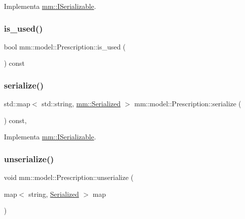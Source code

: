 Implementa \hyperlink{classmm_1_1_i_serializable_a9717e6da47fcbac3ffa2e68152464e0a}{mm\+::\+I\+Serializable}.

\mbox{\label{classmm_1_1model_1_1_prescription_a23ae0807248a2cd86232b11927c9eea2}} 
\subsubsection{\texorpdfstring{is\+\_\+used()}{is\_used()}}
{\footnotesize\ttfamily bool mm\+::model\+::\+Prescription\+::is\+\_\+used (\begin{DoxyParamCaption}{ }\end{DoxyParamCaption}) const}

\mbox{\label{classmm_1_1model_1_1_prescription_a592ff88dfa9625a383a7b073a64863b1}} 
\subsubsection{\texorpdfstring{serialize()}{serialize()}}
{\footnotesize\ttfamily std\+::map$<$ std\+::string, \hyperlink{structmm_1_1_serialized}{mm\+::\+Serialized} $>$ mm\+::model\+::\+Prescription\+::serialize (\begin{DoxyParamCaption}{ }\end{DoxyParamCaption}) const\hspace{0.3cm}{\ttfamily [override]}, {\ttfamily [virtual]}}



Implementa \hyperlink{classmm_1_1_i_serializable_a20a59e2324c8dbf6fefe4d11ae89d0fb}{mm\+::\+I\+Serializable}.

\mbox{\label{classmm_1_1model_1_1_prescription_a6c38e4ee2fca09b18d61aaa214316b9e}} 
\subsubsection{\texorpdfstring{unserialize()}{unserialize()}}
{\footnotesize\ttfamily void mm\+::model\+::\+Prescription\+::unserialize (\begin{DoxyParamCaption}\item[{map$<$ string, \hyperlink{structmm_1_1_serialized}{Serialized} $>$}]{map }\end{DoxyParamCaption})\hspace{0.3cm}{\ttfamily [override]}}



